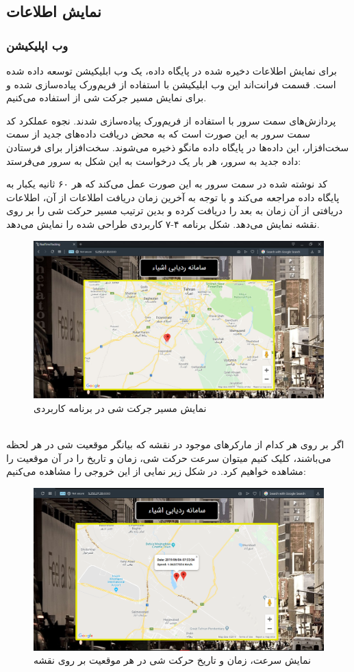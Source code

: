 \subsection{نمایش اطلاعات}
\subsubsection{وب اپلیکیشن}
برای نمایش اطلاعات دخیره شده در پایگاه داده، یک وب ابلیکیشن توسعه داده شده است. قسمت فرانت‌اند این وب ابلیکیشن با استفاده از فریم‌ورک  پیاده‌سازی شده و برای نمایش مسیر جرکت شی از  استفاده می‌کنیم.


پردازش‌های سمت سرور با استفاده از فریم‌ورک  پیاده‌سازی شدند. نجوه عملکرد کد سمت سرور به این صورت است که به محض دریافت داده‌های جدید از سمت سخت‌افزار، این داده‌ها در پایگاه داده مانگو ذخیره می‌شوند. سخت‌افزار برای فرستادن داده جدید به سرور، هر بار یک درخواست  به این شکل به سرور می‌فرستد: 


کد نوشته شده در سمت سرور به این صورت عمل می‌کند که هر ۶۰ ثانیه یکبار به پایگاه داده مراجعه می‌کند و با توجه به آخرین زمان دریافت اطلاعات از آن، اطلاعات دریافتی از  آن زمان به بعد را دریافت کرده و بدین ترتیب مسیر حرکت شی را بر روی نقشه نمایش می‌دهد.
\newpage
شکل برنامه ۴-۷ کاربردی طراحی شده را نمایش می‌دهد.
\\
 \begin{figure}[!h]
 	\centerline{\includegraphics[width=.9\textwidth]{webapp}}
 	\caption{نمایش مسیر جرکت شی در برنامه کاربردی}
 \end{figure}
\\
 اگر بر روی هر کدام از مارکرهای موجود در نقشه که بیانگر موقعیت شی در هر لحظه می‌باشند، کلیک کنیم میتوان سرعت حرکت شی، زمان و تاریخ را در آن موقعیت را مشاهده خواهیم کرد. در شکل زیر نمایی از این خروجی را مشاهده می‌کنیم:
  \begin{figure}[!h]
 	\centerline{\includegraphics[width=.9\textwidth]{webapp2}}
 	\caption{نمایش سرعت، زمان و تاریخ حرکت شی در هر موقعیت بر روی نقشه}
 \end{figure}
